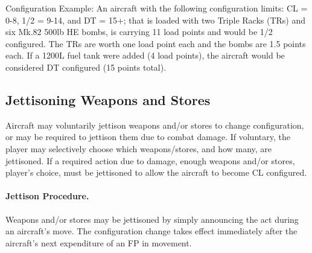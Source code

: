 Configuration Example: An aircraft with the following configuration limits: CL = 0-8, 1/2 = 9-14, and DT = 15+; that is loaded with two Triple Racks (TRs) and six Mk.82 500lb HE bombs, is carrying 11 load points and would be 1/2 configured. The TRs are worth one load point each and the bombs are 1.5 points each. If a 1200L fuel tank were added (4 load points), the aircraft would be considered DT configured (15 points total).

\subsection{Jettisoning Weapons and Stores}

Aircraft may voluntarily jettison weapons and/or stores to change configuration, or may be required to jettison them due to combat damage. If voluntary, the player may selectively choose which weapons/stores, and how many, are jettisoned. If a required action due to damage, enough weapons and/or stores, player's choice, must be jettisoned to allow the aircraft to become CL configured.

\paragraph{Jettison Procedure.} Weapons and/or stores may be jettisoned by simply announcing the act during an aircraft's move. The configuration change takes effect immediately after the aircraft's next expenditure of an FP in movement.
